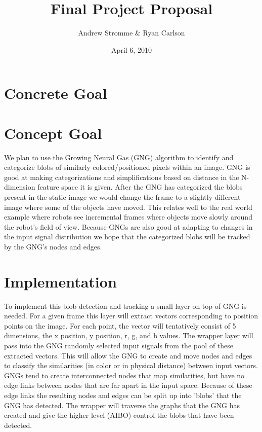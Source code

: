 \documentclass{article}
\begin{document}
\title{Final Project Proposal}
\author{Andrew Stromme \& Ryan Carlson}
\date{April 6, 2010}
\maketitle

\section{Concrete Goal}

\section{Concept Goal}
We plan to use the Growing Neural Gas (GNG) algorithm to identify and categorize blobs of similarly colored/positioned pixels within an image. GNG is good at making categorizations and simplifications based on distance in the N-dimension feature space it is given. After the GNG has categorized the blobs present in the static image we would change the frame to a slightly different image where some of the objects have moved. This relates well to the real world example where robots see incremental frames where objects move slowly around the robot's field of view. Because GNGs are also good at adapting to changes in the input signal distribution we hope that the categorized blobs will be tracked by the GNG's nodes and edges.

\section{Implementation}
To implement this blob detection and tracking a small layer on top of GNG is needed. For a given frame this layer will extract vectors corresponding to position points on the image. For each point, the vector will tentatively consist of 5 dimensions, the x position, y position, r, g, and b values. The wrapper layer will pass into the GNG randomly selected input signals from the pool of these extracted vectors. This will allow the GNG to create and move nodes and edges to classify the similarities (in color or in physical distance) between input vectors. GNGs tend to create interconnected nodes that map similarities, but have no edge links between nodes that are far apart in the input space. Because of these edge links the resulting nodes and edges can be split up into 'blobs' that the GNG has detected. The wrapper will traverse the graphs that the GNG has created and give the higher level (AIBO) control the blobs that have been detected.
\end{document}
